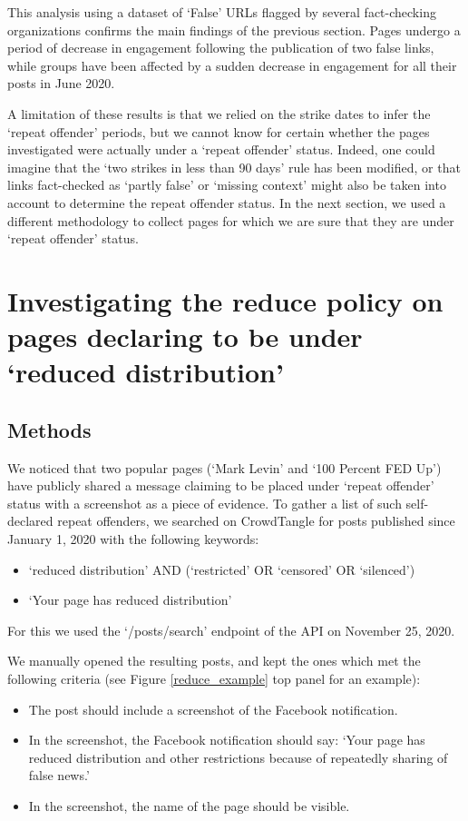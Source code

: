 \documentclass[review]{elsarticle}
\begin{document}
{{This analysis using a dataset of `False' URLs flagged by several fact-checking organizations confirms the main findings of the previous section.
Pages undergo a period of decrease in engagement following the publication of two false links, while groups have been affected by a sudden decrease in engagement for all their posts in June 2020.

A limitation of these results is that we relied on the strike dates to infer the `repeat offender' periods, but we cannot know for certain whether the pages investigated were actually under a `repeat offender' status.
Indeed, one could imagine that the `two strikes in less than 90 days' rule has been modified, or that links fact-checked as `partly false' or `missing context' might also be taken into account to determine the repeat offender status.
In the next section, we used a different methodology to collect pages for which we are sure that they are under `repeat offender' status.

\section{Investigating the reduce policy on pages declaring to be under `reduced distribution'} 

\subsection{Methods}

We noticed that two popular pages (`Mark Levin' and `100 Percent FED Up') have publicly shared a message claiming to be placed under `repeat offender' status with a screenshot as a piece of evidence.
To gather a list of such self-declared repeat offenders, we searched on CrowdTangle for posts published since January 1, 2020 with the following keywords:
\begin{itemize}
\item `reduced distribution' AND (`restricted' OR `censored' OR `silenced')
\item `Your page has reduced distribution'
\end{itemize}
For this we used the `/posts/search' endpoint of the API on November 25, 2020. 

We manually opened the resulting posts, and kept the ones which met the following criteria (see Figure \ref{reduce_example} top panel for an example):
\begin{itemize}
\item The post should include a screenshot of the Facebook notification.
\item In the screenshot, the Facebook notification should say: `Your page has reduced distribution and other restrictions because of repeatedly sharing of false news.'
\item In the screenshot, the name of the page should be visible.
\end{itemize}

}}
\end{document}
